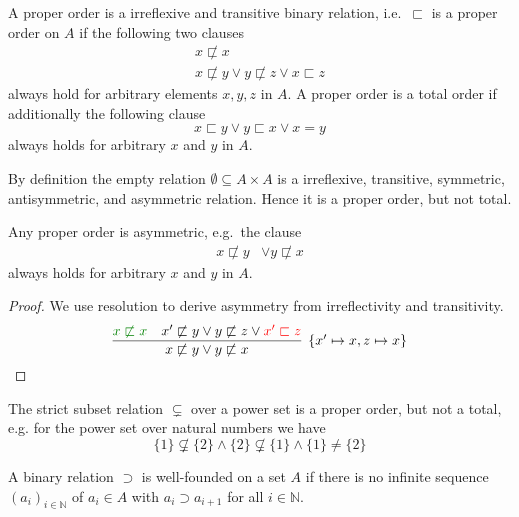 \begin{definition}
	A {\myem proper order} is a irreflexive and transitive binary relation, 
	i.e.~$\sqsubset$ is a proper order on $A$ if the following two clauses
	\begin{align*}
	x\not\sqsubset x
	\tag*{irreflexivivity}
	\\
	x\not\sqsubset y \lor  y \not\sqsubset z \lor x\sqsubset z
	\tag*{transitivity}
	\end{align*}
	always hold for arbitrary elements $x,y,z$ in $A$.
	A proper order is a {\myem total order} if additionally the following clause
	\[
		x \sqsubset y \lor y \sqsubset x  \lor x=y \tag*{totality}
	\]
	always holds for arbitrary $x$ and $y$ in $A$.
\end{definition}

\begin{example}
	By definition the empty relation $\emptyset \subseteq A \times A$ is a
	irreflexive,
	transitive,
	symmetric,
	antisymmetric,
	and asymmetric
	relation. 
	Hence it is a proper order, but not total.
\end{example}

\begin{lemma}
	Any proper order is asymmetric, e.g.~the clause
	\begin{align*}
	x\not\sqsubset y &\lor y\not\sqsubset x \tag*{asymmetry}
	\end{align*}
	always holds for arbitrary $x$ and $y$ in $A$.
\end{lemma}

\begin{proof} We use resolution to derive asymmetry from irreflectivity and transitivity.
	\[
			\infer[\{x'\mapsto x, z\mapsto x \}]{
			x\not\sqsubset y \lor y\not\sqsubset x }{
			{\colHi x\not\sqsubset x} & x'\not\sqsubset y \lor  y \not\sqsubset z \lor {\colLo x'\sqsubset z}
		}
	\]
\end{proof}

\begin{example}The strict subset relation $\subsetneq$ over a power set is a proper order, but not a total, 
	e.g. for the power set over natural numbers we have 
	\[
	\{ 1 \} \not\subsetneq \{ 2 \}
	\land \{ 2 \} \not\subsetneq \{ 1 \}
	\land 	\{ 1 \} \neq \{ 2 \}
	\tag*{non-totality}
	\]
\end{example}



\begin{definition}
	A binary relation $\supset$ is {\myem well-founded} on a set $A$ if there is no infinite sequence 
	$(a_i)_{i\in\mathbb{N}}$ of $a_i\in A$
	with $a_i\supset a_{i+1}$ for all $i\in\mathbb{N}$.
\end{definition}

